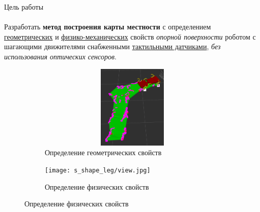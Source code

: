 \begin{frame}[t]{Цель работы}
    \framesubtitle{}
    Разработать \textbf{метод построения карты местности} с определением \underline{геометрических} и \underline{физико-механических} свойств \textit{опорной поверхности} роботом с шагающими движителями снабженными \underline{тактильными датчиками}, \textit{без использования оптических сенсоров}.
    \begin{figure}[H]
        \begin{subfigure}{0.49\textwidth}
            \centering\includegraphics[height=4cm,width=1\textwidth,keepaspectratio]{../images/slides/geom_prop.png}
            \caption*{Определение геометрических свойств}
        \end{subfigure}
        \begin{subfigure}{0.49\textwidth}
            \centering\texttt{[image: s\_shape\_leg/view.jpg]}
            \caption*{Определение физических свойств}
        \end{subfigure}
    \end{figure}
\end{frame}


